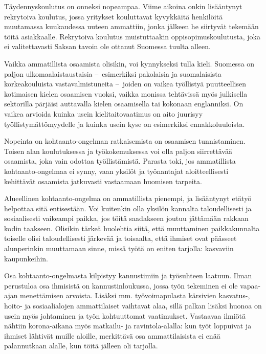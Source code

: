 \documentclass[nobib,finnish,oneside,openany,notoc,a4paper]{tufte-book}
\begin{document}
Täydennyskoulutus on onneksi nopeampaa. Viime aikoina onkin lisääntynyt
rekrytoiva koulutus, jossa yritykset kouluttavat kyvykkäitä henkilöitä
muutamassa kuukaudessa uuteen ammattiin, jonka jälkeen he siirtyvät
tekemään töitä asiakkaalle. Rekrytoiva koulutus muistuttaakin
oppisopimuskoulutusta, joka ei valitettavasti Saksan tavoin ole ottanut
Suomessa tuulta alleen.

Vaikka ammatillista osaamista olisikin, voi kynnykseksi tulla kieli.
Suomessa on paljon ulkomaalaistaustaisia --~esimerkiksi pakolaisia ja
suomalaisista korkeakouluista vastavalmistuneita --~joiden on vaikea
työllistyä puutteellisen kotimaisen kielen osaamisen vuoksi, vaikka
monissa tehtävissä myös julkisella sektorilla pärjäisi auttavalla kielen
osaamisella tai kokonaan englanniksi. On vaikea arvioida kuinka usein
kielitaitovaatimus on aito juurisyy työllistymättömyydelle ja kuinka
usein kyse on esimerkiksi ennakkoluuloista.

Nopeinta on kohtaanto-ongelman ratkaisemista on osaamisen tunnistaminen.
Toisen alan koulutuksessa ja työkokemuksessa voi olla paljon
siirrettävää osaamista, joka vain odottaa työllistämistä. Parasta toki,
jos ammatillista kohtaanto-ongelmaa ei synny, vaan yksilöt ja
työnantajat aloitteellisesti kehittävät osaamista jatkuvasti vastaamaan
huomisen tarpeita.

Alueellinen kohtaanto-ongelma on ammatillista pienempi, ja lisääntynyt
etätyö helpottaa sitä entisestään. Voi kuitenkin olla yksilön kannalta
taloudellisesti ja sosiaalisesti vaikeampi paikka, jos töitä saadakseen
joutuu jättämään rakkaan kodin taakseen. Olisikin tärkeä huolehtia
siitä, että muuttaminen paikkakunnalta toiselle olisi taloudellisesti
järkevää ja toisaalta, että ihmiset ovat päässeet alunperinkin
muuttamaan sinne, missä työtä on eniten tarjolla: kasvaviin
kaupunkeihin.

Osa kohtaanto-ongelmasta kilpistyy kannustimiin ja työsuhteen laatuun.
Ilman perustuloa osa ihmisistä on kannustinloukussa, jossa työn
tekeminen ei ole vapaa-ajan menettämisen arvoista. Lisäksi mm.
työvoimapulasta kärsivien kasvatus-, hoito- ja sosiaalialojen
ammattilaiset vaihtavat alaa, sillä palkan lisäksi huonoa on usein myös
johtaminen ja työn kohtuuttomat vaatimukset. Vastaavaa ilmiötä nähtiin
korona-aikana myös matkailu- ja ravintola-alalla: kun työt loppuivat ja
ihmiset lähtivät muille aloille, merkittävä osa ammattilaisista ei enää
palannutkaan alalle, kun töitä jälleen oli tarjolla.
\end{document}
